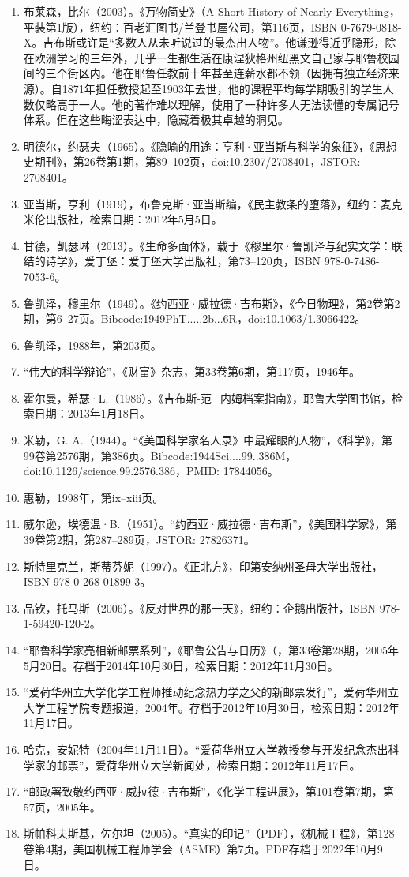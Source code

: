 \begin{enumerate}
\item 布莱森，比尔（2003）。《万物简史》（A Short History of Nearly Everything，平装第1版），纽约：百老汇图书/兰登书屋公司，第116页，ISBN 0-7679-0818-X。吉布斯或许是“多数人从未听说过的最杰出人物”。他谦逊得近乎隐形，除在欧洲学习的三年外，几乎一生都生活在康涅狄格州纽黑文自己家与耶鲁校园间的三个街区内。他在耶鲁任教前十年甚至连薪水都不领（因拥有独立经济来源）。自1871年担任教授起至1903年去世，他的课程平均每学期吸引的学生人数仅略高于一人。他的著作难以理解，使用了一种许多人无法读懂的专属记号体系。但在这些晦涩表达中，隐藏着极其卓越的洞见。
\item 明德尔，约瑟夫（1965）。《隐喻的用途：亨利·亚当斯与科学的象征》，《思想史期刊》，第26卷第1期，第89–102页，doi:10.2307/2708401，JSTOR: 2708401。
\item 亚当斯，亨利（1919），布鲁克斯·亚当斯编，《民主教条的堕落》，纽约：麦克米伦出版社，检索日期：2012年5月5日。
\item 甘德，凯瑟琳（2013）。《生命多面体》，载于《穆里尔·鲁凯泽与纪实文学：联结的诗学》，爱丁堡：爱丁堡大学出版社，第73–120页，ISBN 978-0-7486-7053-6。
\item 鲁凯泽，穆里尔（1949）。《约西亚·威拉德·吉布斯》，《今日物理》，第2卷第2期，第6–27页。Bibcode:1949PhT.....2b...6R，doi:10.1063/1.3066422。
\item 鲁凯泽，1988年，第203页。
\item “伟大的科学辩论”，《财富》杂志，第33卷第6期，第117页，1946年。
\item 霍尔曼，希瑟·L.（1986）。《吉布斯-范·内姆档案指南》，耶鲁大学图书馆，检索日期：2013年1月18日。
\item 米勒，G. A.（1944）。“《美国科学家名人录》中最耀眼的人物”，《科学》，第99卷第2576期，第386页。Bibcode:1944Sci....99..386M，doi:10.1126/science.99.2576.386，PMID: 17844056。
\item 惠勒，1998年，第ix–xiii页。
\item 威尔逊，埃德温·B.（1951）。“约西亚·威拉德·吉布斯”，《美国科学家》，第39卷第2期，第287–289页，JSTOR: 27826371。
\item 斯特里克兰，斯蒂芬妮（1997）。《正北方》，印第安纳州圣母大学出版社，ISBN 978-0-268-01899-3。
\item 品钦，托马斯（2006）。《反对世界的那一天》，纽约：企鹅出版社，ISBN 978-1-59420-120-2。
\item “耶鲁科学家亮相新邮票系列”，《耶鲁公告与日历》（，第33卷第28期，2005年5月20日。存档于2014年10月30日，检索日期：2012年11月30日。
\item “爱荷华州立大学化学工程师推动纪念热力学之父的新邮票发行”，爱荷华州立大学工程学院专题报道，2004年。存档于2012年10月30日，检索日期：2012年11月17日。
\item 哈克，安妮特（2004年11月11日）。“爱荷华州立大学教授参与开发纪念杰出科学家的邮票”，爱荷华州立大学新闻处，检索日期：2012年11月17日。
\item “邮政署致敬约西亚·威拉德·吉布斯”，《化学工程进展》，第101卷第7期，第57页，2005年。
\item 斯帕科夫斯基，佐尔坦（2005）。“真实的印记”（PDF），《机械工程》，第128卷第4期，美国机械工程师学会（ASME）第7页。PDF存档于2022年10月9日。
\end{enumerate}

